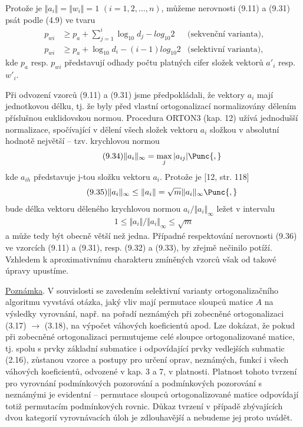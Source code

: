 Protože je
%
$ \Vert a_i \Vert = \Vert w_i \Vert = 1$
$(i=1,2,\ldots,n)$,
%
můžeme nerovnosti (9.11) a (9.31) psát podle (4.9) ve tvaru
%
\begin{align*}
\tag{9.32}
p_{wi} &\ge p_a + \sum_{j=1}^i \log_{10} d_j - log_{10} 2
&\textrm{(sekvenční varianta),}
\\
\tag{9.33}
p_{wi} &\ge p_a + \log_{10} d_i - (i-1)log_{10} 2
&\textrm{(selektivní varianta),}
\end{align*}
%
kde $p_a$ resp. $p_{wi}$ představují odhady počtu platných cifer složek
vektorů $a'_i$ resp. $w'_i$.


Při odvození vzorců (9.11) a (9.31) jsme předpokládali, že
vektory $a_i$ mají jednotkovou délku, tj. že byly před vlastní
ortogonalizací normalizovány dělením příslušnou euklidovskou
normou. Procedura ORTON3 (kap. 12) užívá jednodušší 
normalizace, spočívající v dělení všech složek vektoru $a_i$ složkou
v absolutní hodnotě největší -- tzv. krychlovou normou
%
\begin{align*}
\tag{9.34}
\Vert a_i \Vert_\infty = \max_j | a_{ij}| \Punc{,}
\end{align*}
%
kde $a_{ih}$ představuje j-tou složku vektoru $a_i$. Protože je
[12, str. 118]
%
\begin{align*}
\tag{9.35}
\Vert a_i \Vert_\infty \le \Vert a_i \Vert = \sqrt m \Vert a_i \Vert_\infty
\Punc{,}
\end{align*}
%
bude délka vektoru děleného krychlovou normou
%
$a_i/{\Vert a_i \Vert_\infty}$
%
ležet v intervalu
%
\begin{align*}
\tag{9.36}
1 \le \Vert a_i \Vert / {\Vert a_i \Vert_\infty} \le \sqrt m
\end{align*}
%
a může tedy být obecně větší než jedna. Případné respektování
nerovnosti (9.36) ve vzorcích (9.11) a (9.31), resp. (9.32) a
(9.33), by zřejmě nečinilo potíží. Vzhledem k aproximativnímu
%
charakteru  zmíněných vzorců však od takové úpravy upustíme.
%

\underline{Poznámka}. V souvislosti se zavedením selektivní varianty
ortogonalizačního algoritmu vyvstává otázka, jaký vliv mají
%
permutace sloupců matice $A$ na výsledky vyrovnání, např. na
pořadí neznámých při zobecněné ortogonalizaci (3.17) $\rightarrow$ (3.18),
na výpočet váhových koeficientů apod. Lze dokázat, že pokud
při zobecněné ortogonalizaci permutujeme celé sloupce
ortogonalizované matice, tj. spolu s prvky základní submatice i
odpovídající prvky vedlejších submatic (2.16), zůstanou vzorce
a postupy pro určení oprav, neznámých, funkcí i všech váhových
koeficientů, odvozené v kap. 3 a 7, v platnosti. Platnost
tohoto tvrzení pro vyrovnání podmínkových pozorování a podmínkových
pozorování s neznámými je evidentní -- permutace sloupců
ortogonalizované matice odpovídají totiž permutacím podmínkových
rovnic. Důkaz tvrzení v případě zbývajících dvou kategorií
vyrovnávacích úloh je zdlouhavější a nebudeme jej proto uvádět.
